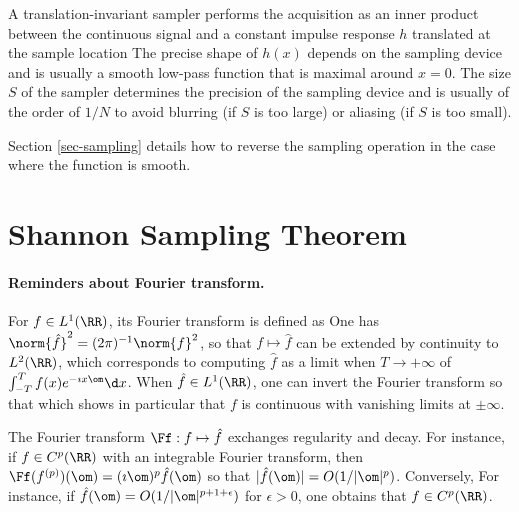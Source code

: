 A translation-invariant sampler performs the acquisition as an inner product between the continuous signal and a constant impulse response $h$ translated at the sample location
The precise shape of $h(x)$ depends on the sampling device and is usually a smooth low-pass function that is maximal around $x=0$. The size $S$ of the sampler determines the precision of the sampling device and is usually of the order of $1/N$ to avoid blurring (if $S$ is too large) or aliasing (if $S$ is too small).

Section \ref{sec-sampling} details how to reverse the sampling operation in the case where the function is smooth.


\section{Shannon Sampling Theorem}
\label{subsec-sampling}

\paragraph{Reminders about Fourier transform.}

For $f \in L^1(\RR)$, its Fourier transform is defined as
One has $\norm{\hat f}^2 = (2\pi)^{-1} \norm{f}^2$, so that $f \mapsto \hat f$ can be extended by continuity to $L^2(\RR)$, which corresponds to computing $\hat f$ as a limit when $T \rightarrow +\infty$ of $\int_{-T}^T f(x) e^{-\imath x \om} \d x$.
%
When $\hat f \in L^1(\RR)$, one can invert the Fourier transform so that
which shows in particular that $f$ is continuous with vanishing limits at $\pm\infty$. 

The Fourier transform $\Ff : f \mapsto \hat f$ exchanges regularity and decay. For instance, if $f \in C^p(\RR)$ with an integrable Fourier transform, then $\Ff(f^{(p)})(\om) = (\imath \om)^{p} \hat f(\om)$ so that $|\hat f(\om)|=O(1/|\om|^p)$. 
%
Conversely, 
For instance, if $\hat f(\om)=O(1/|\om|^{p+1+\epsilon})$ for $\epsilon>0$, one obtains that $f \in C^p(\RR)$. 


